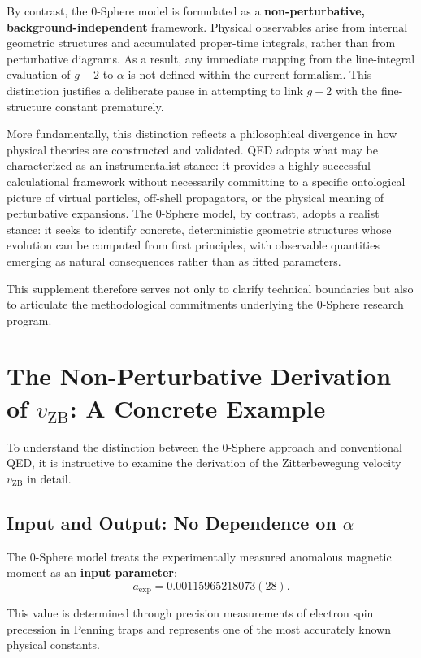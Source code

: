 \documentclass[12pt,letterpaper]{article}
\begin{document}
By contrast, the 0-Sphere model is formulated as a \textbf{non-perturbative, background-independent} framework. 
Physical observables arise from internal geometric structures and accumulated proper-time integrals, rather than from perturbative diagrams. 
As a result, any immediate mapping from the line-integral evaluation of $g-2$ to $\alpha$ is not defined within the current formalism. 
This distinction justifies a deliberate pause in attempting to link $g-2$ with the fine-structure constant prematurely.

More fundamentally, this distinction reflects a philosophical divergence in how physical theories are constructed and validated. QED adopts what may be characterized as an instrumentalist stance: it provides a highly successful calculational framework without necessarily committing to a specific ontological picture of virtual particles, off-shell propagators, or the physical meaning of perturbative expansions. The 0-Sphere model, by contrast, adopts a realist stance: it seeks to identify concrete, deterministic geometric structures whose evolution can be computed from first principles, with observable quantities emerging as natural consequences rather than as fitted parameters.

This supplement therefore serves not only to clarify technical boundaries but also to articulate the methodological commitments underlying the 0-Sphere research program.


\section{The Non-Perturbative Derivation of $v_{\mathrm{ZB}}$: A Concrete Example}

To understand the distinction between the 0-Sphere approach and conventional QED, it is instructive to examine the derivation of the Zitterbewegung velocity $v_{\mathrm{ZB}}$ in detail.

\subsection{Input and Output: No Dependence on $\alpha$}

The 0-Sphere model treats the experimentally measured anomalous magnetic moment as an \textbf{input parameter}:
\begin{equation}
a_{\mathrm{exp}} = 0.00115965218073(28).
\end{equation}

This value is determined through precision measurements of electron spin precession in Penning traps and represents one of the most accurately known physical constants.
\end{document}
